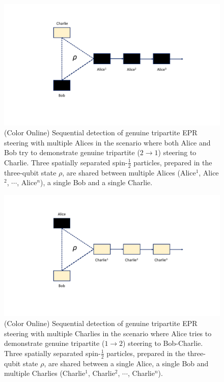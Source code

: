 \documentclass[pra,a4paper,aps,twocolumn,showpacs,superscriptaddress,groupedaddress]{revtex4}
\begin{document}
\begin{figure}[t!]
\centering
\includegraphics[scale=0.4]{Untrusted2SDI.pdf}
\caption{(Color Online) Sequential detection of genuine tripartite EPR steering with multiple Alices in the scenario where both Alice and Bob try to demonstrate genuine tripartite ($2 \rightarrow 1$) steering to Charlie. Three spatially separated spin-$\frac{1}{2}$ particles, prepared in the three-qubit state $\rho$,  are shared between multiple Alices (Alice$^1$, Alice$^2$, $\cdots$, Alice$^n$), a single Bob and a single Charlie. }
\label{fig2}
\end{figure}

\begin{figure}[t!]
\centering
\includegraphics[scale=0.4]{Trusted1SDI.pdf}
\caption{(Color Online) Sequential detection of genuine tripartite EPR steering with multiple Charlies in the scenario where Alice tries to demonstrate genuine tripartite    
($1 \rightarrow 2$) steering to Bob-Charlie. Three spatially separated spin-$\frac{1}{2}$ particles,  prepared in the three-qubit state $\rho$,  are shared between a single Alice, a single Bob and multiple Charlies (Charlie$^1$, Charlie$^2$, $\cdots$, Charlie$^n$). }
\label{fig3}
\end{figure}
\end{document}
